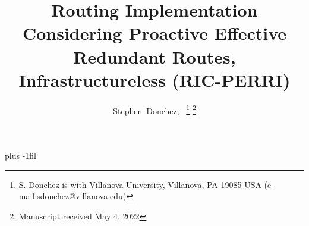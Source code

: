 \documentclass[11pt, journal, onecolumn, letterpaper,]{LaTeX_Assets/IEEETransactions_LaTeX/IEEEtran/IEEEtran}
\begin{document}
    \title{Routing Implementation Considering Proactive Effective Redundant Routes, Infrastructureless (RIC-PERRI)}
    \author{Stephen~Donchez,~%
    \thanks{S. Donchez is with Villanova University, Villanova, PA 19085 USA 
    \mbox{(e-mail:sdonchez@villanova.edu)}}%
    \thanks{Manuscript received May 4, 2022}}%

    \maketitle

    

    

    
    
    

    

    
    

    \vskip 0pt plus -1fil

    
\end{document}
